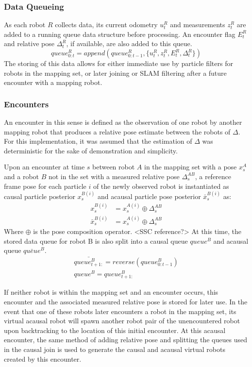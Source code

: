 \subsubsection{Data Queueing}
As each robot $R$ collects data, its current odometry $u_t^R$ and measurements $z_t^R$ are added to a running queue data structure before processing. An encounter flag $E_t^R$ and relative pose $\Delta_t^R$, if available, are also added to this queue. 
$$queue_{0:t}^R = append(queue_{0:t-1}^R, \{ u_t^R, z_t^R, E_t^R, \Delta_t^R \})$$
The storing of this data allows for either immediate use by particle filters for robots in the mapping set, or later joining or SLAM filtering after a future encounter with a mapping robot.
\vspace{0.1in}
\subsubsection{Encounters}
An encounter in this sense is defined as the observation of one robot by another mapping robot that produces a relative pose estimate between the robots of $\Delta$. For this implementation, it was assumed that the estimation of $\Delta$ was deterministic for the sake of demonstration and simplicity.

Upon an encounter at time $s$ between robot $A$ in the mapping set with a pose $x_s^A$ and a robot $B$ not in the set with a measured relative pose $\Delta_s^{AB}$, a reference frame pose for each particle $i$ of the newly observed robot is instantiated as causal particle posterior $x_s^{B(i)}$ and acausal particle pose posterior $\bar{x}_s^{B(i)}$ as:
\begin{align*}
x_s^{B(i)} &= x_s^{A(i)} \oplus \Delta_s^{AB} \\
\bar{x}_s^{B(i)} &= x_s^{A(i)} \oplus \Delta_s^{AB}
\end{align*}
Where $\oplus$ is the pose composition operator. <SSC reference?>
At this time, the stored data queue for robot B is also split into a causal queue $queue^B$ and acausal queue $\bar{queue}^B$.
\begin{align*}
\bar{queue_{t+1:}^B} = reverse(queue_{0:t-1}^B) \\
queue^B = queue_{t+1:}^B
\end{align*}

If neither robot is within the mapping set and an encounter occurs, this encounter and the associated measured relative pose is stored for later use. In the event that one of these robots later encounters a robot in the mapping set, its virtual acausal robot will spawn another robot pair of the unencountered robot upon backtracking to the location of this initial encounter. At this acausal encounter, the same method of adding relative pose and splitting the queues used in the causal join is used to generate the causal and acausal virtual robots created by this encounter.

